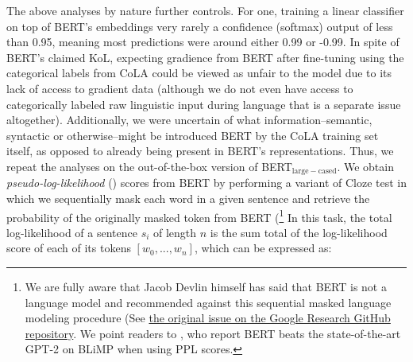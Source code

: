 \DIFaddend The above analyses by nature \DIFdelbegin {}\DIFdelend \DIFaddbegin {}\DIFaddend further controls.  For one, training a linear classifier on top of BERT's embeddings very rarely \DIFdelbegin {}\DIFdelend \DIFaddbegin {}\DIFaddend a confidence (softmax) output of less than 0.95, meaning most predictions were around either 0.99 or -0.99.  In spite of BERT's claimed KoL, expecting gradience from BERT after fine-tuning using the categorical labels from CoLA could be viewed as unfair to the model due to its lack of access to gradient data (although we do not even have access to categorically labeled raw linguistic input during language \DIFdelbegin {}\DIFdelend \DIFaddbegin {}\DIFaddend that is a separate issue altogether).  %
Additionally, we were uncertain of what information--semantic, syntactic or otherwise--might be introduced \DIFdelbegin {}\DIFdelend \DIFaddbegin {}\DIFaddend BERT by the CoLA training set itself, as opposed to already being present in BERT's \DIFdelbegin {}\DIFdelend \DIFaddbegin {}\DIFaddend representations.  Thus, we repeat the analyses on the out-of-the-box version of BERT$_{\mathrm{large- cased}}$.  We obtain \textit{pseudo-log-likelihood} (\DIFdelbegin {}\DIFdelend \DIFaddbegin {}\DIFaddend ) scores from BERT by performing a variant of \DIFdelbegin {}\DIFdelend \DIFaddbegin {}\DIFaddend Cloze test in which we sequentially mask each word in a given sentence and retrieve the probability of the originally masked token from BERT (\DIFdelbegin {}\DIFdelend \DIFaddbegin {}\DIFaddend \footnote{We are fully aware that Jacob Devlin himself has said that BERT is not a language model and recommended against this sequential masked language modeling procedure (See \href{https://github.com/google-research/bert/issues/35}{the original issue on the Google Research GitHub repository}.  We point readers to \DIFdelbegin {}\DIFdelend \DIFaddbegin {}\DIFaddend , who report BERT beats the state-of-the-art GPT-2 on BLiMP \DIFdelbegin {}\DIFdelend \DIFaddbegin {}\DIFaddend when using PPL scores. %
}  In this task, the total log-likelihood of a sentence $s_i$ of length $n$ is the sum total of the log-likelihood score of each of its tokens $[w_0,...,w_n]$, which can be expressed as:
